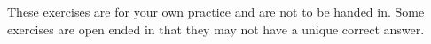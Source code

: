 \documentclass{article}
\newcommand{\enterProblemHeader}[1]{
\nobreak\extramarks{#1}{#1 continued on next page\ldots}\nobreak
\nobreak\extramarks{#1 (continued)}{#1 continued on next page\ldots}\nobreak
}
\newcommand{\exitProblemHeader}[1]{
\nobreak\extramarks{#1 (continued)}{#1 continued on next page\ldots}\nobreak
\nobreak\extramarks{#1}{}\nobreak
}
\newcounter{homeworkProblemCounter} %
\newcommand{\homeworkProblemName}{}
\newenvironment{ex}[1][Problem \arabic{homeworkProblemCounter}]{ %
\stepcounter{homeworkProblemCounter} %
\renewcommand{\homeworkProblemName}{#1} %
\section{\homeworkProblemName} %
}{
}
\newif\ifsolutions
\begin{document}
	
These exercises are for your own practice and are not to be handed in. Some exercises are open ended in that they may not have a unique correct answer.

%	
\end{document}
